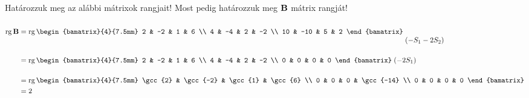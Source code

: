 \begin{exercise}{Határozzuk meg az alábbi mátrixok rangjait!}
{		Most pedig határozzuk meg $\mathbf{B}$ mátrix rangját!
		\begin{align*}
			\rg \rmat B
			 & = \rg
			\begin{bamatrix}{4}{7.5mm}
				2  & -2  & 1 & 6  \\
				4  & -4  & 2 & -2 \\
				10 & -10 & 5 & 2
			\end{bamatrix}
			\;
			\begin{matrix}
				\\\\(-S_1 - 2S_2)
			\end{matrix}
			\\
			 & = \rg
			\begin{bamatrix}{4}{7.5mm}
				2  & -2  & 1 & 6  \\
				4  & -4  & 2 & -2 \\
				0 & 0 & 0 & 0
			\end{bamatrix}
			\;
			\begin{matrix}
				\\(-2S_1)\\\,
			\end{matrix}
			\\
			 & = \rg
			\begin{bamatrix}{4}{7.5mm}
				\gcc{2} & \gcc{-2} & \gcc{1} & \gcc{6}   \\
				0       & 0        & 0       & \gcc{-14} \\
				0       & 0        & 0       & 0
			\end{bamatrix}
			\\
			 & =2
		\end{align*}
	}
\end{exercise}
